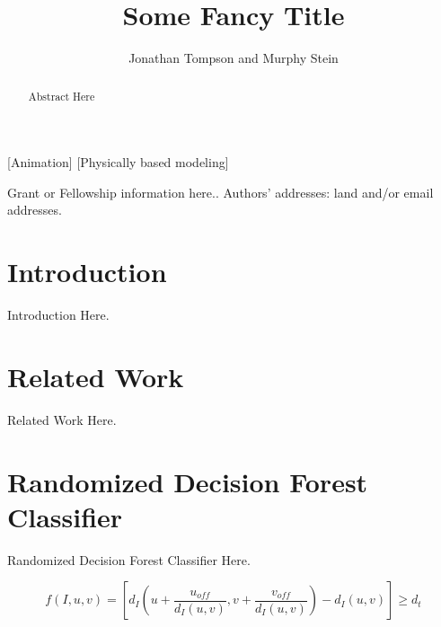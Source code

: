 \documentclass{acmtog}
\begin{document}

\title{Some Fancy Title} %

\author{Jonathan Tompson {\upshape and} Murphy Stein }

[Animation]
[Physically based modeling]




\maketitle

\begin{bottomstuff}
Grant or Fellowship information here..
Authors' addresses: land and/or email addresses.
\end{bottomstuff}


\begin{abstract}
  Abstract Here
\end{abstract}

\section{Introduction}
\label{sec:introduction}

Introduction Here.

\section{Related Work}
\label{sec:relatedwork}

Related Work Here.

\section{Randomized Decision Forest Classifier}
\label{sec:randomizeddecisionforestclassifier}

Randomized Decision Forest Classifier Here.

\begin{equation}
\textstyle
f\left(I, u, v\right)=\left[d_I\left(u + \frac{u_{off}}{d_I\left(u,v\right)}, v + \frac{v_{off}}{d_I\left(u,v\right)}\right) - d_I\left(u,v\right)\right]\geq d_{t}
\end{equation}
\end{document}
